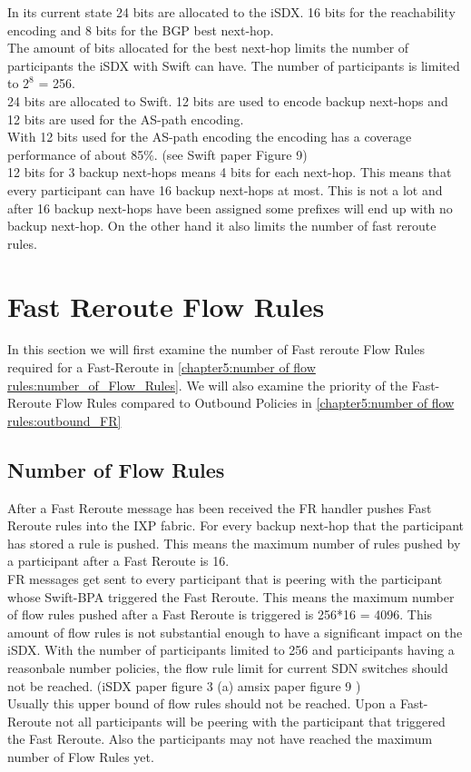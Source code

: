 In its current state 24 bits are allocated to the iSDX. 16 bits for the reachability encoding and 8 bits for the BGP best next-hop. \\
The amount of bits allocated for the best next-hop limits the number of participants the iSDX with Swift can have. The number of participants is limited to $2^8$ = 256. \\
24 bits are allocated to Swift. 12 bits are used to encode backup next-hops and 12 bits are used for the AS-path encoding. \\
With 12 bits used for the AS-path encoding the encoding has a coverage performance of about 85\%. (see Swift paper Figure 9)\\
12 bits for 3 backup next-hops means 4 bits for each next-hop. This means that every participant can have 16 backup next-hops at most. This is not a lot and after 16 backup next-hops have been assigned some prefixes will end up with no backup next-hop. On the other hand it also limits the number of fast reroute rules. \\


\section{\label{chapter5:number of flow rules}Fast Reroute Flow Rules}

In this section we will first examine the number of Fast reroute Flow Rules required for a Fast-Reroute in \ref{chapter5:number of flow rules:number_of_Flow_Rules}. We will also examine the priority of the Fast-Reroute Flow Rules compared to Outbound Policies in \ref{chapter5:number of flow rules:outbound_FR}

\subsection{\label{chapter5:number of flow rules:number_of_Flow_Rules}Number of Flow Rules}

After a Fast Reroute message has been received the FR handler pushes Fast Reroute rules into the IXP fabric. For every backup next-hop that the participant has stored a rule is pushed. This means the maximum number of rules pushed by a participant after a Fast Reroute is 16. \\
FR messages get sent to every participant that is peering with the participant whose Swift-BPA triggered the Fast Reroute. This means the maximum number of flow rules pushed after a Fast Reroute is triggered is 256*16 = 4096. This amount of flow rules is not substantial enough to have a significant impact on the iSDX. With the number of participants limited to 256 and participants having a reasonbale number policies, the flow rule limit for current SDN switches should not be reached. (iSDX paper figure 3 (a) amsix paper figure 9 )\\
Usually this upper bound of flow rules should not be reached. Upon a Fast-Reroute not all participants will be peering with the participant that triggered the Fast Reroute. Also the participants may not have reached the maximum number of Flow Rules yet.

